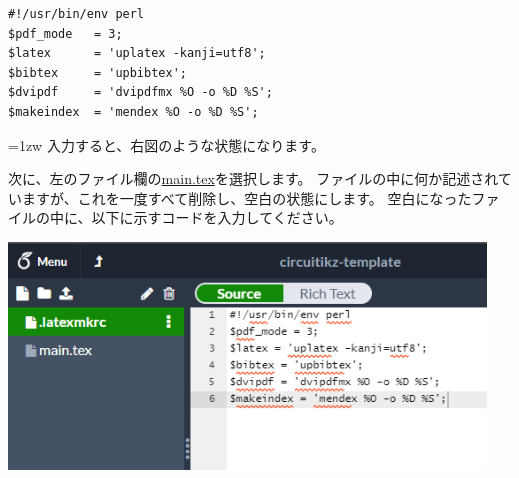 		\begin{mdframed}
			\begin{verbatim}
#!/usr/bin/env perl
$pdf_mode   = 3;
$latex      = 'uplatex -kanji=utf8';
$bibtex     = 'upbibtex';
$dvipdf     = 'dvipdfmx %O -o %D %S';
$makeindex  = 'mendex %O -o %D %S';
			\end{verbatim}
		\end{mdframed}

		\noindent
		\begin{minipage}{0.4\hsize}\parindent=1zw
			入力すると、右図のような状態になります。

			次に、左のファイル欄の\url{main.tex}を選択します。
			ファイルの中に何か記述されていますが、これを一度すべて削除し、空白の状態にします。
			空白になったファイルの中に、以下に示すコードを入力してください。
		\end{minipage}\hfill
		\begin{minipage}{0.6\hsize}
			\begin{flushright}
				\includegraphics[width=0.95\textwidth]{overleaf-text-latexmkrc.png}
			\end{flushright}
		\end{minipage}
		
